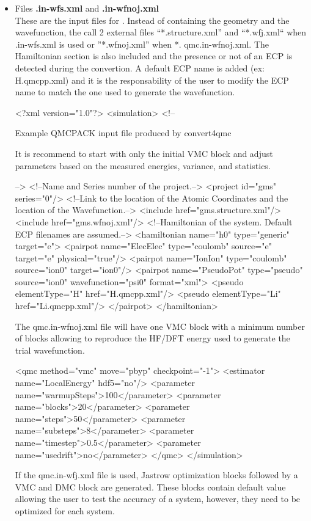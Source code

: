 \begin{itemize}
 \item Files \textbf{.in-wfs.xml} and \textbf{.in-wfnoj.xml} \\
 These are the input files for \qmcpack. Instead of containing the geometry and the wavefunction, the call 2 external files ``*.structure.xml'' and ``*.wfj.xml`` when .in-wfs.xml is used or ''*.wfnoj.xml'' when *. qmc.in-wfnoj.xml. The Hamiltonian section is also included and the presence or not of an ECP is detected during the convertion. A default ECP name is added (ex: H.qmcpp.xml) and it is the responsability of the user to modify the ECP name to match the one used to generate the wavefunction.\\
  \begin{shade}
  <?xml version="1.0"?>
<simulation>
  <!--
 
Example QMCPACK input file produced by convert4qmc
 
It is recommend to start with only the initial VMC block and adjust
parameters based on the measured energies, variance, and statistics.

-->
  <!--Name and Series number of the project.-->
  <project id="gms" series="0"/>
  <!--Link to the location of the Atomic Coordinates and the location of 
      the Wavefunction.-->
  <include href="gms.structure.xml"/>
  <include href="gms.wfnoj.xml"/>
  <!--Hamiltonian of the system. Default ECP filenames are assumed.-->
  <hamiltonian name="h0" type="generic" target="e">
    <pairpot name="ElecElec" type="coulomb" source="e" target="e" 
                                                   physical="true"/>
    <pairpot name="IonIon" type="coulomb" source="ion0" target="ion0"/>
    <pairpot name="PseudoPot" type="pseudo" source="ion0" wavefunction="psi0" 
                                                           format="xml">
      <pseudo elementType="H" href="H.qmcpp.xml"/>
      <pseudo elementType="Li" href="Li.qmcpp.xml"/>
    </pairpot>
  </hamiltonian>

 \end{shade}

 The qmc.in-wfnoj.xml file will have one VMC block with a minimum number of blocks allowing to reproduce the HF/DFT energy used to generate the trial wavefunction.
 
 \begin{shade}
  <qmc method="vmc" move="pbyp" checkpoint="-1">
    <estimator name="LocalEnergy" hdf5="no"/>
    <parameter name="warmupSteps">100</parameter>
    <parameter name="blocks">20</parameter>
    <parameter name="steps">50</parameter>
    <parameter name="substeps">8</parameter>
    <parameter name="timestep">0.5</parameter>
    <parameter name="usedrift">no</parameter>
  </qmc>
</simulation>
 \end{shade}
If the qmc.in-wfj.xml file is used, Jastrow optimization blocks followed by a VMC and DMC block are generated. These blocks contain default value allowing the user to test the accuracy of a system, however, they need to be optimized for each system. 


\end{itemize}
